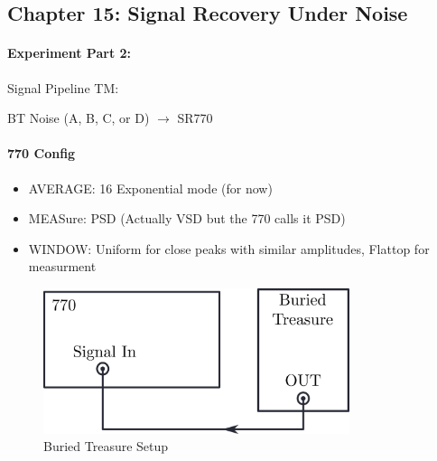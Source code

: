 \documentclass[../main.tex]{subfiles}
\begin{document}
\newpage
{}
\subsection*{Chapter 15: Signal Recovery Under Noise}

\paragraph*{Experiment Part 2:} Signal Pipeline TM:

BT Noise (A, B, C, or D) $\to$ SR770

\paragraph*{770 Config}
\begin{itemize}
    \item AVERAGE: 16 Exponential mode (for now)
    \item MEASure: PSD (Actually VSD but the 770 calls it PSD)  
    \item WINDOW: Uniform for close peaks with similar amplitudes, Flattop for measurment
\end{itemize}

\begin{figure}[ht]
    \centering
    \includegraphics[width=0.8\textwidth]{exp1_2.png}
    \caption{Buried Treasure Setup}
    \label{fig:exp1_2}
\end{figure}
\end{document}

